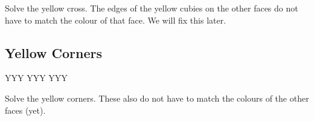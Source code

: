 \documentclass{article}
\begin{document}
    \begin{goal}[\DrawRubikFaceUp]
        Solve the yellow cross.
        The edges of the yellow cubies on the other faces do not have to match the colour of that face.
        We will fix this later.
    \end{goal}


    \subsection{Yellow Corners}
    \RubikCubeGreyAll
    \RubikFaceUp YYY YYY YYY

    \begin{goal}[\DrawRubikFaceUp]
        Solve the yellow corners.
        These also do not have to match the colours of the other faces (yet).
    \end{goal}
\end{document}
